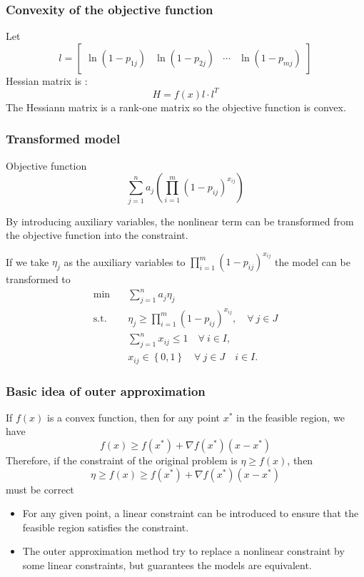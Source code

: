 \documentclass[CJK,10pt]{beamer}
\begin{document}
\begin{frame}
    \frametitle{Convexity of the objective function}
    Let
    \begin{equation*}
        l = \begin{bmatrix}
            \ln(1 - p_{1j}) & \ln(1 - p_{2j}) & \cdots & \ln(1 - p_{mj})
        \end{bmatrix}
    \end{equation*}
    Hessian matrix is :
    \begin{equation*}
        H = f(x)l\cdot l^T
    \end{equation*}
    The Hessiann matrix is a rank-one matrix so the objective function is convex.
\end{frame}

\begin{frame}
    \frametitle{Transformed model}
    Objective function
    \begin{equation*}
        \sum_{j=1}^n a_j \left( \prod_{i=1}^m (1 -  p_{ij})^{x_{ij}} \right)
    \end{equation*}
    {\footnotesize
    By introducing auxiliary variables, the nonlinear term can be transformed from the objective function into the constraint.
    
    If we take $\eta_j$ as the auxiliary variables to $\prod_{i=1}^m (1 -  p_{ij})^{x_{ij}}$ the model can be transformed to 
    \begin{align*} \tag{S0'}
        \min\quad & \sum_{j=1}^n a_j \eta_j \\ 
        \mathrm{s. t.}\quad & \eta_j \geq \prod_{i=1}^m (1 -  p_{ij})^{x_{ij}}, \quad \forall ~ j \in J \\ 
        &\sum_{j=1}^n x_{ij} \leq 1\quad \forall ~ i \in I,\\
        & x_{ij} \in \left\{ 0,1 \right\} \quad \forall ~ j\in J\quad i \in I.
    \end{align*}
    }
\end{frame}

\begin{frame}
    \frametitle{Basic idea of outer approximation}
    If $f(x)$ is a convex function, then for any point $x^*$ in the feasible region, we have
    \begin{equation*}
        f(x) \geq f(x^*) + \nabla f(x^*)(x - x^*)
    \end{equation*}
    Therefore, if the constraint of the original problem is $\eta \geq f(x)$, then
    \begin{equation*}
        \eta \geq f(x) \geq f(x^*) + \nabla f(x^*)(x - x^*)
    \end{equation*}
    must be correct
    \begin{itemize}
        \item For any given point, a linear constraint can be introduced to ensure that the feasible region satisfies the constraint.
        \item The outer approximation method try to replace a nonlinear constraint by some linear constraints, but guarantees the models are equivalent.
    \end{itemize}
    
    
\end{frame}
\end{document}
